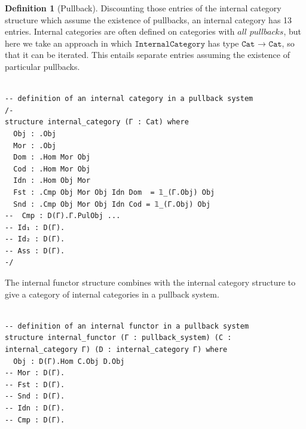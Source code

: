 \documentclass{book}
\theoremstyle{definition}
\newtheorem{definition}{Definition}
\newcounter{lcounter}
\begin{document}
\begin{definition}[Pullback]
Discounting those entries of the internal category structure which assume the existence of pullbacks, an internal category has 13 entries. Internal categories are often defined on categories with $\textit{all pullbacks}$, but here we take an approach in which $\texttt{InternalCategory}$ has type $\texttt{Cat → Cat}$, so that it can be iterated. This entails separate entries assuming the existence of particular pullbacks.\\

\begin{center}
\begin{tcolorbox}[width=5in,colback={white},title={\begin{center}\texttt{Lean \thelcounter} \addtocounter{lcounter}{1}  \end{center}},colbacktitle=Blue,coltitle=black]
\begin{verbatim}

-- definition of an internal category in a pullback system
/-
structure internal_category (Γ : Cat) where
  Obj : .Obj
  Mor : .Obj
  Dom : .Hom Mor Obj
  Cod : .Hom Mor Obj
  Idn : .Hom Obj Mor
  Fst : .Cmp Obj Mor Obj Idn Dom  = 𝟙_(Γ.Obj) Obj
  Snd : .Cmp Obj Mor Obj Idn Cod = 𝟙_(Γ.Obj) Obj
--  Cmp : D(Γ).Γ.PulObj ...
-- Id₁ : D(Γ).
-- Id₂ : D(Γ).
-- Ass : D(Γ).
-/

\end{verbatim}
\end{tcolorbox}
\end{center}

The internal functor structure combines with the internal category structure to give a category of internal categories in a pullback system.\\

\begin{center}
\begin{tcolorbox}[width=5in,colback={white},title={\begin{center}\texttt{Lean \thelcounter} \addtocounter{lcounter}{1}  \end{center}},colbacktitle=Blue,coltitle=black]
\begin{verbatim}

-- definition of an internal functor in a pullback system
structure internal_functor (Γ : pullback_system) (C : internal_category Γ) (D : internal_category Γ) where
  Obj : D(Γ).Hom C.Obj D.Obj
-- Mor : D(Γ).
-- Fst : D(Γ).
-- Snd : D(Γ).
-- Idn : D(Γ).
-- Cmp : D(Γ).


\end{verbatim}
\end{tcolorbox}
\end{center}
\end{definition}
\end{document}
